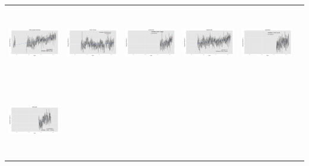 \documentclass[landscape,final,a0paper,fontscale=0.285]{baposter}
\begin{document}
\begin{poster}
{\begin{minipage}{\linewidth}
\label{tab:name}
\noindent\begin{tabular}{@{}c@{}c@{}c@{}c@{}c@{}c@{}}
    \includegraphics[width=3.2cm,height=3.2cm]{X15075.png}&
	\includegraphics[width=3.2cm,height=3.2cm]{X15079.png}&
	\includegraphics[width=3.2cm,height=3.2cm]{X15088.png}&
	\includegraphics[width=3.2cm,height=3.2cm]{X15098.png}&
	\includegraphics[width=3.2cm,height=3.2cm]{X15110.png}&\\
	\includegraphics[width=3.2cm,height=3.2cm]{X15113.png}&

\end{tabular}
\end{minipage}}
\end{poster}
\end{document}

